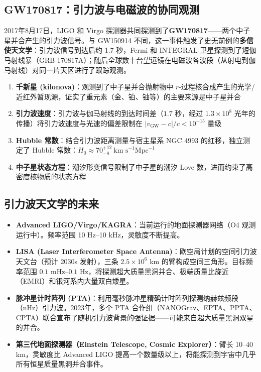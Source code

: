 \subsection{GW170817：引力波与电磁波的协同观测}

2017年8月17日，LIGO 和 Virgo 探测器共同探测到了\textbf{GW170817}——两个中子星并合产生的引力波信号。与 GW150914 不同，这一事件触发了史无前例的\textbf{多信使天文学}：引力波信号到达后约 1.7 秒，Fermi 和 INTEGRAL 卫星探测到了短伽马射线暴（GRB 170817A）；随后全球数十台望远镜在电磁波各波段（从射电到伽马射线）对同一片天区进行了跟踪观测。

\begin{property}[GW170817 的科学成果]
\begin{enumerate}
    \item \textbf{千新星 (kilonova)}：观测到了中子星并合抛射物中 $r$-过程核合成产生的光学/近红外暂现源，证实了重元素（金、铂、铀等）的主要来源是中子星并合
    \item \textbf{引力波速度}：引力波与伽马射线的到达时间差（$1.7$ 秒，经过 $1.3 \times 10^8$ 光年的传播）将引力波速度与光速的偏差限制在 $|v_{\text{GW}} - c|/c < 10^{-15}$ 量级
    \item \textbf{Hubble 常数}：结合引力波距离测量与宿主星系 NGC 4993 的红移，独立测定了 Hubble 常数：$H_0 \approx 70^{+12}_{-8}\ \text{km s}^{-1}\text{Mpc}^{-1}$
    \item \textbf{中子星状态方程}：潮汐形变信号限制了中子星的潮汐 Love 数，进而约束了高密度核物质的状态方程
\end{enumerate}
\end{property}

\subsection{引力波天文学的未来}

\begin{note}[新一代引力波探测器]
\begin{itemize}
    \item \textbf{Advanced LIGO/Virgo/KAGRA}：当前运行的地面探测器网络（O4 观测运行中）。频率范围 10 Hz--10 kHz，灵敏度不断提高。
    \item \textbf{LISA (Laser Interferometer Space Antenna)}：欧空局计划的空间引力波天文台（预计 2030s 发射），三条 $2.5\times10^6$ km 的臂构成空间三角形。目标频率范围 $0.1$ mHz--$0.1$ Hz，将探测超大质量黑洞并合、极端质量比旋近（EMRI）和银河系内大量双白矮星。
    \item \textbf{脉冲星计时阵列 (PTA)}：利用毫秒脉冲星精确计时阵列探测纳赫兹频段（nHz）引力波。2023年，多个 PTA 合作组（NANOGrav、EPTA、PPTA、CPTA）联合宣布了随机引力波背景的强证据——可能来自超大质量黑洞双星的并合。
    \item \textbf{第三代地面探测器（Einstein Telescope, Cosmic Explorer）}：臂长 10--40 km，灵敏度比 Advanced LIGO 提高一个数量级以上，将能探测到宇宙中几乎所有恒星质量黑洞并合事件。
\end{itemize}
\end{note}

